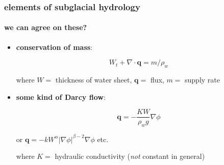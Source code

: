 \documentclass[hide notes,intlimits]{beamer}
\begin{document}
\begin{frame}
  \frametitle{elements of subglacial hydrology}
  \framesubtitle{we can agree on these?}

\newcommand{\bq}{\mathbf{q}}

  \begin{itemize}
    \item \textbf{conservation of mass}:
    
    $$W_t + \nabla \cdot \bq = m / \rho_w$$

where $W=$ thickness of water sheet, $\bq=$ flux, $m=$ supply rate



    \item \textbf{some kind of Darcy flow}:
    
    $$\bq = - \frac{K W}{\rho_w g} \nabla \phi$$
    
    \scriptsize or \quad $\bq = - k W^\alpha |\nabla \phi|^{\beta - 2} \nabla \phi$ \quad etc.
    
\normalsize where $K=$ hydraulic conductivity (\emph{not} constant in general)
  \end{itemize}

\end{frame}
\end{document}
